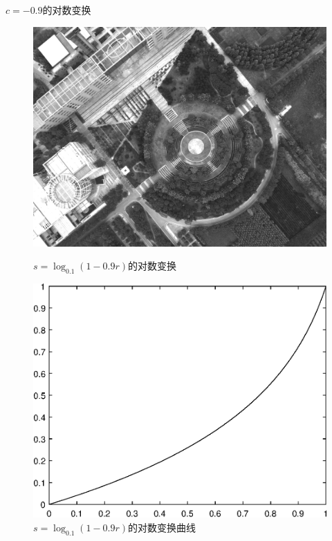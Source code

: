 $c=-0.9$的对数变换
\begin{figure}[H]
	\centering
	\begin{minipage}{0.45\linewidth}
		\includegraphics[width=\linewidth]{figure/DJI_0027_Log_-90.png}
		\caption{$s=\log_{0.1}(1-0.9r)$的对数变换}
	\end{minipage}
	\begin{minipage}{0.45\linewidth}
		\includegraphics[width=\linewidth]{figure/DJI_0027_Log_-90_Graph.eps}
		\caption{$s=\log_{0.1}(1-0.9r)$的对数变换曲线}
	\end{minipage}
\end{figure}